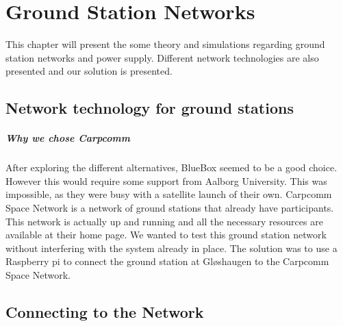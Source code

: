 \chapter{Ground Station Networks}

This chapter will present the some theory and simulations regarding ground station networks and power supply. Different network technologies are also presented and our solution is presented.





\section{Network technology for ground stations}





\paragraph{Why we chose Carpcomm}
After exploring the different alternatives, BlueBox seemed to be a good choice. However this would require some support from Aalborg University. This was impossible, as they were busy with a satellite launch of their own. Carpcomm Space Network is a network of ground stations that already have participants. This network is actually up and running and all the necessary resources are available at their home page. We wanted to test this ground station network without interfering with the system already in place. The solution was to use a Raspberry pi to connect the ground station at Gløshaugen to the Carpcomm Space Network.
 


\section {Connecting to the Network}

